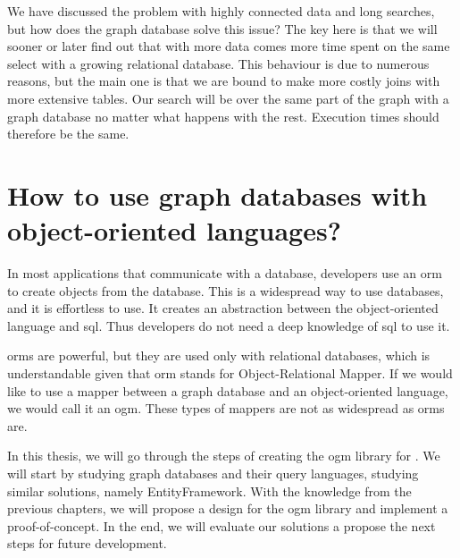 \begin{introduction}
    We have discussed the problem with highly connected data and long searches, but how does the graph database solve this issue?
    The key here is that we will sooner or later find out that with more data comes more time spent on the same select with a growing relational database.
    This behaviour is due to numerous reasons, but the main one is that we are bound to make more costly joins with more extensive tables.
    Our search will be over the same part of the graph with a graph database no matter what happens with the rest. Execution times should therefore be the same.

    \section{How to use graph databases with object-oriented languages?}

    In most applications that communicate with a database, developers use an \acrshort{orm} to create objects from the database.
    This is a widespread way to use databases, and it is effortless to use. It creates an abstraction between the object-oriented language and \acrshort{sql}.
    Thus developers do not need a deep knowledge of \acrshort{sql} to use it.

    \acrshort{orm}s are powerful, but they are used only with relational databases, which is understandable given that \acrshort{orm} stands for Object-Relational Mapper.
    If we would like to use a mapper between a graph database and an object-oriented language, we would call it an \acrfull{ogm}. These types of mappers are not as widespread as \acrshort{orm}s are.

    In this thesis, we will go through the steps of creating the \acrshort{ogm} library for \CS.
    We will start by studying graph databases and their query languages, studying similar solutions, namely EntityFramework.
    With the knowledge from the previous chapters, we will propose a design for the \acrshort{ogm} library and implement a proof-of-concept.
    In the end, we will evaluate our solutions a propose the next steps for future development.

\end{introduction}
